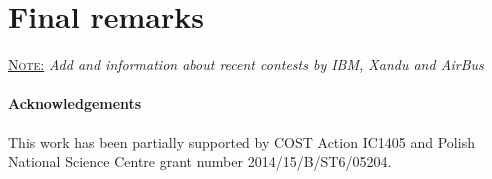 \documentclass[a4paper,11pt]{article}
\newcommand{\note}[1]{%
    \par\vspace{6pt}\noindent\underline{\textsc{Note:}} \emph{#1}\vspace{6pt}%
}
\begin{document}
\section{Final remarks}


\note{Add \cite{dyakonov2018case} and information about recent contests by IBM, 
Xandu and AirBus~\cite{airbus-challenge}}

\paragraph{Acknowledgements} This work has been partially supported by COST 
Action IC1405 and Polish National Science Centre grant number 
2014/15/B/ST6/05204.



\end{document}
